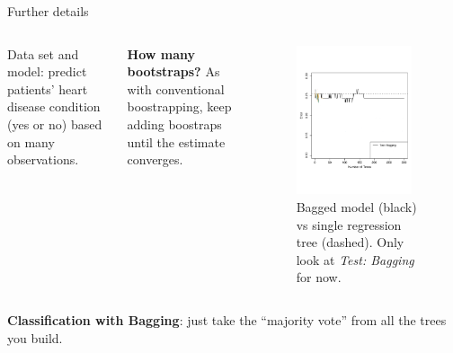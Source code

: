 \documentclass[mathserif, aspectratio=169]{beamer}
\begin{document}
\begin{frame}{Further details}

\begin{columns}

Data set and model: predict patients' heart disease condition (yes or no) based on many observations.

\vspace{5mm}

\textbf{How many bootstraps?}  As with conventional boostrapping, keep adding boostraps until the estimate converges.  

\vspace*{-10mm}
\begin{figure}
\includegraphics[width=0.9\textwidth]{islr88_only_bag.pdf}
\caption*{\footnotesize Bagged model (black) vs single regression tree (dashed).  Only look at \textit{Test: Bagging} for now.}
\end{figure}
\end{columns}
\pause

\textbf{Classification with Bagging}: just take the ``majority vote'' from all the trees you build.

\end{frame}
\end{document}
